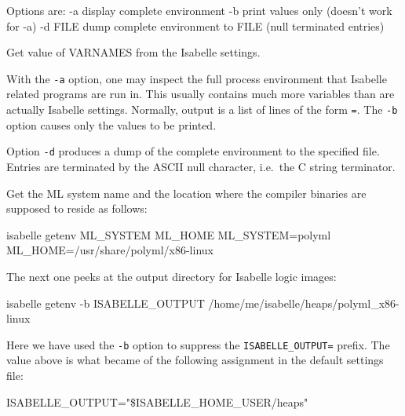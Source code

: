 \begin{isabellebody}
\begin{isamarkuptext}
\begin{ttbox}
  Options are:
    -a           display complete environment
    -b           print values only (doesn't work for -a)
    -d FILE      dump complete environment to FILE
                 (null terminated entries)

  Get value of VARNAMES from the Isabelle settings.
\end{ttbox}

  With the \verb|-a| option, one may inspect the full process
  environment that Isabelle related programs are run in. This usually
  contains much more variables than are actually Isabelle settings.
  Normally, output is a list of lines of the form \verb|=|. The \verb|-b| option
  causes only the values to be printed.

  Option \verb|-d| produces a dump of the complete environment
  to the specified file.  Entries are terminated by the ASCII null
  character, i.e.\ the C string terminator.%
\end{isamarkuptext}%
\isamarkuptrue%
%
\isamarkuptrue%
%
\begin{isamarkuptext}%
Get the ML system name and the location where the compiler binaries
  are supposed to reside as follows:
\begin{ttbox}
isabelle getenv ML_SYSTEM ML_HOME
{\out ML_SYSTEM=polyml}
{\out ML_HOME=/usr/share/polyml/x86-linux}
\end{ttbox}

  The next one peeks at the output directory for Isabelle logic
  images:
\begin{ttbox}
isabelle getenv -b ISABELLE_OUTPUT
{\out /home/me/isabelle/heaps/polyml_x86-linux}
\end{ttbox}
  Here we have used the \verb|-b| option to suppress the
  \verb|ISABELLE_OUTPUT=| prefix.  The value above is what
  became of the following assignment in the default settings file:
\begin{ttbox}
ISABELLE_OUTPUT="\$ISABELLE_HOME_USER/heaps"
\end{ttbox}


\end{isamarkuptext}
\end{isabellebody}
